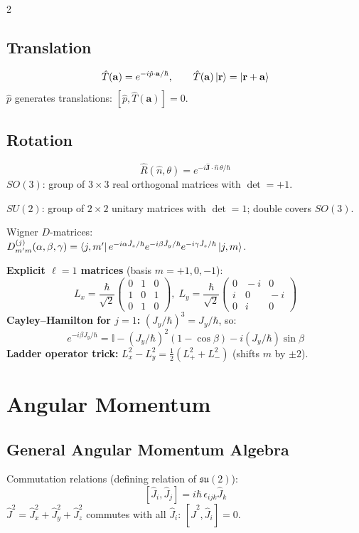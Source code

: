 \documentclass[9pt,a4paper]{article} %
\newcommand{\phat}{\hat{p}}
\newcommand{\Jop}{\hat{\mathbf{J}}}
\newcommand{\Id}{\mathbb{I}}
\begin{document}
\begin{multicols}{2}
\subsection{Translation}
\[
\hat{T}(\mathbf{a})=e^{-i\phat\cdot\mathbf{a}/\hbar},\qquad
\hat{T}(\mathbf{a})\ket{\mathbf{r}}=\ket{\mathbf{r}+\mathbf{a}}
\]
$\phat$ generates translations: $[\phat,\hat{T}(\mathbf{a})]=0$.

\subsection{Rotation}
\[
\hat{R}(\hat{n},\theta)=e^{-i\Jop\cdot\hat{n}\,\theta/\hbar}
\]
$SO(3)$: group of $3\times 3$ real orthogonal matrices with $\det=+1$.

$SU(2)$: group of $2\times 2$ unitary matrices with $\det=1$; double covers $SO(3)$.

Wigner $D$-matrices:\\ $D^{(j)}_{m'm}(\alpha,\beta,\gamma)=\bra{j,m'}e^{-i\alpha\hat{J}_z/\hbar}e^{-i\beta\hat{J}_y/\hbar}e^{-i\gamma\hat{J}_z/\hbar}\ket{j,m}$.

{\footnotesize
\textbf{Explicit $\ell=1$ matrices} (basis $m=+1,0,-1$):
\[
L_x=\frac{\hbar}{\sqrt{2}}\!\begin{pmatrix}0\!&\!1\!&\!0\\1\!&\!0\!&\!1\\0\!&\!1\!&\!0\end{pmatrix},\;
L_y=\frac{\hbar}{\sqrt{2}}\!\begin{pmatrix}0\!&\!-i\!&\!0\\i\!&\!0\!&\!-i\\0\!&\!i\!&\!0\end{pmatrix}
\]
\textbf{Cayley--Hamilton for $j=1$:} $(J_y/\hbar)^3=J_y/\hbar$, so:
\[
e^{-i\beta J_y/\hbar}=\Id-(J_y/\hbar)^2(1-\cos\beta)-i(J_y/\hbar)\sin\beta
\]
\textbf{Ladder operator trick:}
$L_x^2-L_y^2=\tfrac{1}{2}(L_+^2+L_-^2)$\; (shifts $m$ by $\pm 2$).
}
\section{Angular Momentum}

\subsection{General Angular Momentum Algebra}
Commutation relations (defining relation of $\mathfrak{su}(2)$):
\[
\boxed{[\hat{J}_i,\hat{J}_j]=i\hbar\,\epsilon_{ijk}\hat{J}_k}
\]
$\hat{J}^2=\hat{J}_x^2+\hat{J}_y^2+\hat{J}_z^2$ commutes with all $\hat{J}_i$: $[\hat{J}^2,\hat{J}_i]=0$.


\end{multicols}
\end{document}
